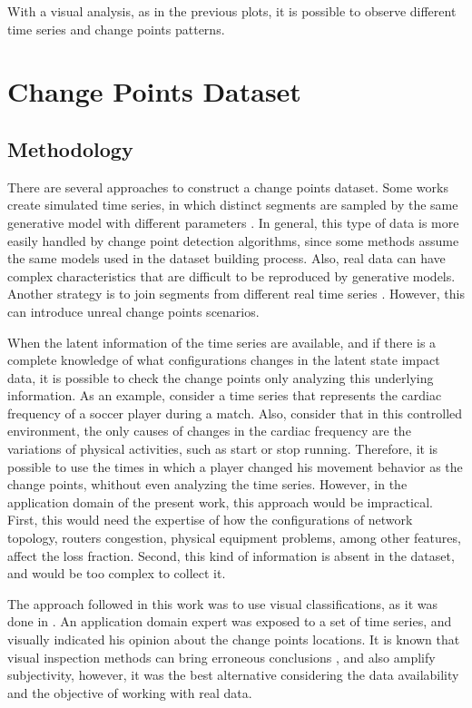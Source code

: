 With a visual analysis, as in the previous plots, it is possible to observe different time series and change points patterns.

\section{Change Points Dataset}

\subsection{Methodology}

There are several approaches to construct a change points dataset. Some works create simulated time series, in which distinct segments are sampled by the same generative model with different parameters \cite{change_point_detection_in_time_series_data_by_relative_density_ratio_estimation}. In general, this type of data is more easily handled by change point detection algorithms, since some methods assume the same models used in the dataset building process. Also, real data can have complex characteristics that are difficult to be reproduced by generative models. Another strategy is to join segments from different real time series \cite{inertial_hidden_markov_models_modeling_change_in_multivariate_time_series}. However, this can introduce unreal change points scenarios.

When the latent information of the time series are available, and if there is a complete knowledge of what configurations changes in the latent state impact data, it is possible to check the change points only analyzing this underlying information. As an example, consider a time series that represents the cardiac frequency of a soccer player during a match. Also, consider that in this controlled environment, the only causes of changes in the cardiac frequency are the variations of physical activities, such as start or stop running. Therefore, it is possible to use the times in which a player changed his movement behavior as the change points, whithout even analyzing the time series. However, in the application domain of the present work, this approach would be impractical. First, this would need the expertise of how the configurations of network topology, routers congestion, physical equipment problems, among other features, affect the loss fraction. Second, this kind of information is absent in the dataset, and would be too complex to collect it.

The approach followed in this work was to use visual classifications, as it was done in \cite{learning_sparse_penalties_for_change_point_detection_using_max_margin_interval_regression}. An application domain expert was exposed to a set of time series, and visually indicated his opinion about the change points locations. It is known that visual inspection methods can bring erroneous conclusions \cite{leveraging_cloud_data_to_mitigate_user_experience_from_breaking_bad}, and also amplify subjectivity, however, it was the best alternative considering the data availability and the objective of working with real data.

